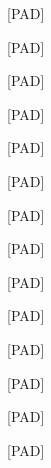 \documentclass[varwidth=150mm]{standalone}
\begin{document}
\begin{CJK*}{UTF8}{gbsn}
{{{\colorbox{red!0.0}{\strut [PAD]} \colorbox{red!0.0}{\strut [PAD]} \colorbox{red!0.0}{\strut [PAD]} \colorbox{red!0.0}{\strut [PAD]} \colorbox{red!0.0}{\strut [PAD]} \colorbox{red!0.0}{\strut [PAD]} \colorbox{red!0.0}{\strut [PAD]} \colorbox{red!0.0}{\strut [PAD]} \colorbox{red!0.0}{\strut [PAD]} \colorbox{red!0.0}{\strut [PAD]} \colorbox{red!0.0}{\strut [PAD]} \colorbox{red!0.0}{\strut [PAD]} \colorbox{red!0.0}{\strut [PAD]} \colorbox{red!0.0}{\strut [PAD]}
}}}
\end{CJK*}
\end{document}
